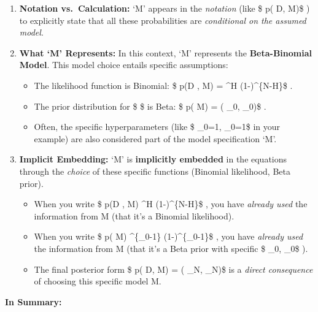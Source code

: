 \documentclass[11pt]{article}
\providecommand{\tightlist}{%
      \setlength{\itemsep}{0pt}\setlength{\parskip}{0pt}}
\begin{document}
\begin{enumerate}
\def\labelenumi{\arabic{enumi}.}
\tightlist
\item
  \textbf{Notation vs.~Calculation:} `M' appears in the \emph{notation}
  (like \$ p(\theta \textbar{} D, M)\$ ) to explicitly state that all
  these probabilities are \emph{conditional on the assumed model}.
\item
  \textbf{What `M' Represents:} In this context, `M' represents the
  \textbf{Beta-Binomial Model}. This model choice entails specific
  assumptions:

  \begin{itemize}
  \tightlist
  \item
    The likelihood function is Binomial: \$ p(D \textbar{} \theta, M) =
     \theta\^{}H (1-\theta)\^{}\{N-H\}\$ .
  \item
    The prior distribution for \$ \theta\$ is Beta: \$
    p(\theta \textbar{} M) = (\theta \textbar{} \alpha\_0,
    \beta\_0)\$ .
  \item
    Often, the specific hyperparameters (like \$ \alpha\_0=1,
    \beta\_0=1\$ in your example) are also considered part of the model
    specification `M'.
  \end{itemize}
\item
  \textbf{Implicit Embedding:} `M' is \textbf{implicitly embedded} in
  the equations through the \emph{choice} of these specific functions
  (Binomial likelihood, Beta prior).

  \begin{itemize}
  \tightlist
  \item
    When you write \$ p(D \textbar{} \theta, M) \propto \theta\^{}H
    (1-\theta)\^{}\{N-H\}\$ , you have \emph{already used} the
    information from M (that it's a Binomial likelihood).
  \item
    When you write \$ p(\theta \textbar{} M)
    \propto \theta\^{}\{\alpha\_0-1\} (1-\theta)\^{}\{\beta\_0-1\}\$ ,
    you have \emph{already used} the information from M (that it's a
    Beta prior with specific \$ \alpha\_0, \beta\_0\$ ).
  \item
    The final posterior form \$ p(\theta \textbar{} D, M) =
    (\theta \textbar{} \alpha\_N, \beta\_N)\$ is a
    \emph{direct consequence} of choosing this specific model M.
  \end{itemize}
\end{enumerate}

\textbf{In Summary:}
\end{document}
